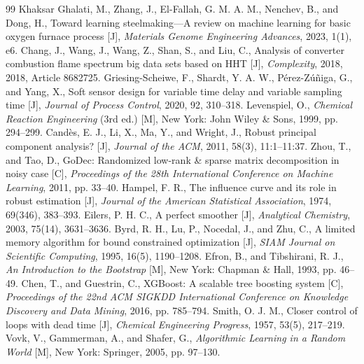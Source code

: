 \begin{thebibliography}{99}
 Khaksar Ghalati, M., Zhang, J., El-Fallah, G. M. A. M., Nenchev, B., and Dong, H., Toward learning steelmaking—A review on machine learning for basic oxygen furnace process [J], \emph{Materials Genome Engineering Advances}, 2023, 1(1), e6.
 Chang, J., Wang, J., Wang, Z., Shan, S., and Liu, C., Analysis of converter combustion flame spectrum big data sets based on HHT [J], \emph{Complexity}, 2018, 2018, Article 8682725.
 Griesing-Scheiwe, F., Shardt, Y. A. W., Pérez-Zúñiga, G., and Yang, X., Soft sensor design for variable time delay and variable sampling time [J], \emph{Journal of Process Control}, 2020, 92, 310--318.
 Levenspiel, O., \emph{Chemical Reaction Engineering} (3rd ed.) [M], New York: John Wiley \& Sons, 1999, pp. 294--299.
 Candès, E. J., Li, X., Ma, Y., and Wright, J., Robust principal component analysis? [J], \emph{Journal of the ACM}, 2011, 58(3), 11:1--11:37.
 Zhou, T., and Tao, D., GoDec: Randomized low-rank \& sparse matrix decomposition in noisy case [C], \emph{Proceedings of the 28th International Conference on Machine Learning}, 2011, pp. 33--40.
 Hampel, F. R., The influence curve and its role in robust estimation [J], \emph{Journal of the American Statistical Association}, 1974, 69(346), 383--393.
 Eilers, P. H. C., A perfect smoother [J], \emph{Analytical Chemistry}, 2003, 75(14), 3631--3636.
 Byrd, R. H., Lu, P., Nocedal, J., and Zhu, C., A limited memory algorithm for bound constrained optimization [J], \emph{SIAM Journal on Scientific Computing}, 1995, 16(5), 1190--1208.
 Efron, B., and Tibshirani, R. J., \emph{An Introduction to the Bootstrap} [M], New York: Chapman \& Hall, 1993, pp. 46--49.
 Chen, T., and Guestrin, C., XGBoost: A scalable tree boosting system [C], \emph{Proceedings of the 22nd ACM SIGKDD International Conference on Knowledge Discovery and Data Mining}, 2016, pp. 785--794.
 Smith, O. J. M., Closer control of loops with dead time [J], \emph{Chemical Engineering Progress}, 1957, 53(5), 217--219.
 Vovk, V., Gammerman, A., and Shafer, G., \emph{Algorithmic Learning in a Random World} [M], New York: Springer, 2005, pp. 97--130.
\end{thebibliography}

